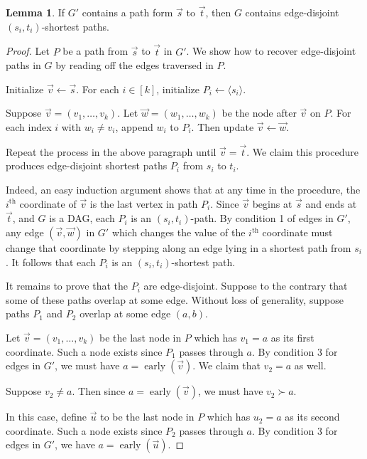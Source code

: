 \documentclass[11pt]{article}
\DeclareMathOperator{\early}{early}
\theoremstyle{definition}
\newtheorem{lemma}[theorem]{Lemma}
\begin{document}
    \begin{lemma}
        \label{metagraph-path-to-EDP}
        If $G'$ contains a path form $\vec{s}$ to $\vec{t}$, then $G$ contains edge-disjoint $(s_i,t_i)$-shortest paths.
    \end{lemma}
    \begin{proof}
        Let $P$ be a path from $\vec{s}$ to $\vec{t}$ in $G'$.
        We show how to recover edge-disjoint paths in $G$ by reading off the edges traversed in $P$.

        Initialize $\vec{v}\leftarrow \vec{s}$. 
        For each $i\in [k]$, initialize $P_i \leftarrow \langle s_i\rangle$.

        Suppose $\vec{v} = (v_1, \dots, v_k)$.
        Let $\vec{w} = (w_1, \dots, w_k)$ be the node after $\vec{v}$ on $P$.
        For each index $i$ with $w_i\neq v_i$, append $w_i$ to $P_i$.
        Then update $\vec{v}\leftarrow \vec{w}$.

        Repeat the process in the above paragraph until $\vec{v} = \vec{t}$.
        We claim this procedure produces edge-disjoint shortest paths $P_i$ from $s_i$ to $t_i$.

        Indeed, an easy induction argument shows that at any time in the procedure, the $i^{\text{th}}$ coordinate of $\vec{v}$ is the last vertex in path $P_i$.
        Since $\vec{v}$ begins at $\vec{s}$ and ends at $\vec{t}$, and $G$ is a DAG, each $P_i$ is an $(s_i,t_i)$-path.
        By condition 1 of edges in $G'$, any edge $(\vec{v},\vec{w})$ in $G'$ which changes the value of the $i^{\text{th}}$ coordinate must change that coordinate by stepping along an edge lying in a shortest path from $s_i$.
        It follows that each $P_i$ is an $(s_i,t_i)$-shortest path.

        It remains to prove that the $P_i$ are edge-disjoint.
        Suppose to the contrary that some of these paths overlap at some edge. 
        Without loss of generality, suppose paths $P_1$ and $P_2$ overlap at some edge $(a,b)$.

        Let $\vec{v} = (v_1, \dots, v_k)$ be the last node in $P$ which has $v_1 = a$ as its first coordinate. 
        Such a node exists since $P_1$ passes through $a$.
        By condition 3 for edges in $G'$, we must have $a = \early(\vec{v})$.
        We claim that $v_2 = a$ as well.

        Suppose $v_2\neq a$.
        Then since $a = \early(\vec{v})$, we must have $v_2 \succ a$.
        
        In this case, define $\vec{u}$ to be the last node in $P$ which has $u_2 = a$ as its second coordinate.
        Such a node exists since $P_2$ passes through $a$.
        By condition 3 for edges in $G'$, we have $a = \early(\vec{u})$.
        

\end{proof}
\end{document}
